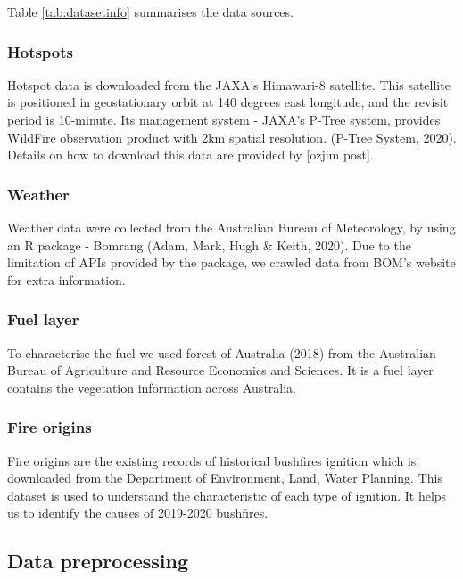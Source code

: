 \documentclass[11pt,a4paper,]{article}
\begin{document}
Table \ref{tab:datasetinfo} summarises the data sources.

\hypertarget{hotspots}{%
\subsubsection{Hotspots}\label{hotspots}}

Hotspot data is downloaded from the JAXA's Himawari-8 satellite. This satellite is positioned in geostationary orbit at 140 degrees east longitude, and the revisit period is 10-minute. Its management system - JAXA's P-Tree system, provides WildFire observation product with 2km spatial resolution. (P-Tree System, 2020). Details on how to download this data are provided by {[}ozjim post{]}.

\hypertarget{weather}{%
\subsubsection{Weather}\label{weather}}

Weather data were collected from the Australian Bureau of Meteorology, by using an R package - Bomrang (Adam, Mark, Hugh \& Keith, 2020). Due to the limitation of APIs provided by the package, we crawled data from BOM's website for extra information.

\hypertarget{fuel-layer}{%
\subsubsection{Fuel layer}\label{fuel-layer}}

To characterise the fuel we used forest of Australia (2018) from the Australian Bureau of Agriculture and Resource Economics and Sciences. It is a fuel layer contains the vegetation information across Australia.

\hypertarget{fire-origins}{%
\subsubsection{Fire origins}\label{fire-origins}}

Fire origins are the existing records of historical bushfires ignition which is downloaded from the Department of Environment, Land, Water Planning. This dataset is used to understand the characteristic of each type of ignition. It helps us to identify the causes of 2019-2020 bushfires.

\hypertarget{data-preprocessing}{%
\subsection{Data preprocessing}\label{data-preprocessing}}
\end{document}
